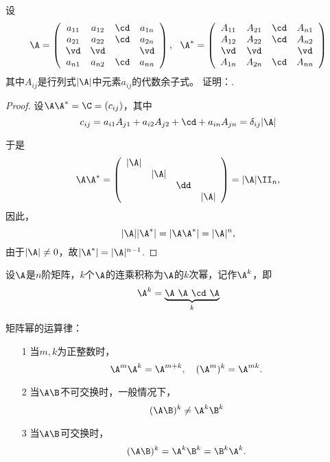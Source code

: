 \begin{li}
  设
  $$
  \A = \left(
    \begin{array}{cccc}
      a_{11} & a_{12} & \cd & a_{1n} \\
      a_{21} & a_{22} & \cd & a_{2n} \\
      \vd   & \vd   &     & \vd   \\
      a_{n1} & a_{n2} & \cd & a_{nn} \\
    \end{array}
  \right), ~~
  \A^* = \left(
    \begin{array}{cccc}
      A_{11} & A_{21} & \cd & A_{n1} \\
      A_{12} & A_{22} & \cd & A_{n2} \\
      \vd   & \vd   &     & \vd   \\
      A_{1n} & A_{2n} & \cd & A_{nn} \\
    \end{array}
  \right)
  $$
  其中$A_{ij}$是行列式$|\A|$中元素$a_{ij}$的代数余子式。
  证明：.      
\end{li}
\begin{proof}      
  设$\A\A^*=\C=(c_{ij})$，其中
  $$
  c_{ij} = a_{i1}A_{j1} + a_{i2}A_{j2} + \cd + a_{in}A_{jn} = \delta_{ij}|\A|
  $$
  
  于是
  $$
  \A\A^* = \left(
    \begin{array}{cccc}
      |\A|&&&\\
          &|\A|&&\\
          &&\dd&\\
          &&&|\A|
    \end{array}
  \right) = |\A| \II_n,
  $$ 
  因此，
  $$
  |\A||\A^*| = |\A\A^*| = |\A|^n,
  $$ 
  由于$|\A|\ne 0$，故$|\A^*|=|\A|^{n-1}$.
\end{proof}
% 

% 
% 
\begin{dingyi}[矩阵幂]
  设$\A$是$n$阶矩阵，$k$个$\A$的连乘积称为$\A$的$k$次幂，记作$\A^k$，即
  $$
  \A^k = \underbrace{\A~ \A~ \cd ~\A}_{k}
  $$
\end{dingyi}
% 
矩阵幂的运算律：
\begin{itemize}
\item[1] 当$m,k$为正整数时，
  $$
  \A^m \A^k = \A^{m+k}, \quad
  (\A^m)^k = \A^{mk}.
  $$  
\item[2]
  当$\A\B$不可交换时，一般情况下，
  $$
  (\A\B)^k \ne \A^k\B^k 
  $$  
\item[3]
  当$\A\B$可交换时，
  $$
  (\A\B)^k = \A^k\B^k =  \B^k\A^k. 
  $$
\end{itemize}

